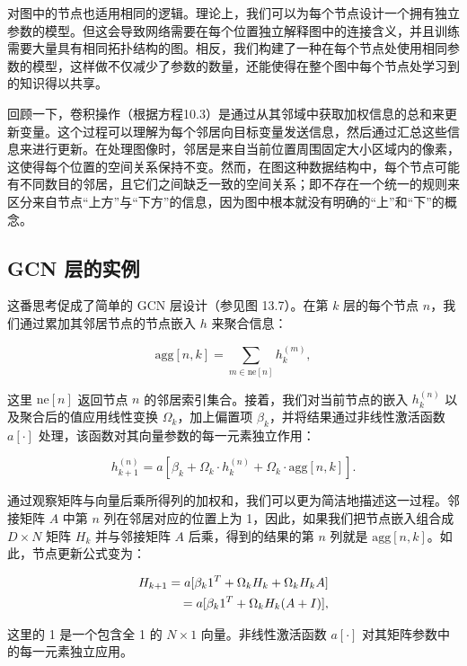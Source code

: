 \documentclass[lang=cn,newtx,10pt,scheme=chinese]{elegantbook}
\begin{document}
对图中的节点也适用相同的逻辑。理论上，我们可以为每个节点设计一个拥有独立参数的模型。但这会导致网络需要在每个位置独立解释图中的连接含义，并且训练需要大量具有相同拓扑结构的图。相反，我们构建了一种在每个节点处使用相同参数的模型，这样做不仅减少了参数的数量，还能使得在整个图中每个节点处学习到的知识得以共享。

回顾一下，卷积操作（根据方程10.3）是通过从其邻域中获取加权信息的总和来更新变量。这个过程可以理解为每个邻居向目标变量发送信息，然后通过汇总这些信息来进行更新。在处理图像时，邻居是来自当前位置周围固定大小区域内的像素，这使得每个位置的空间关系保持不变。然而，在图这种数据结构中，每个节点可能有不同数目的邻居，且它们之间缺乏一致的空间关系；即不存在一个统一的规则来区分来自节点“上方”与“下方”的信息，因为图中根本就没有明确的“上”和“下”的概念。

\subsection{GCN 层的实例}
这番思考促成了简单的 GCN 层设计（参见图 13.7）。在第 \(k\) 层的每个节点 \(n\)，我们通过累加其邻居节点的节点嵌入 \(h\) 来聚合信息：

\begin{equation}
\text{agg}[n, k] = \sum_{m \in \text{ne}[n]} h_k^{(m)}, 
\end{equation}

这里 \(\text{ne}[n]\) 返回节点 \(n\) 的邻居索引集合。接着，我们对当前节点的嵌入 \(h_k^{(n)}\) 以及聚合后的值应用线性变换 \(\Omega_k\)，加上偏置项 \(\beta_k\)，并将结果通过非线性激活函数 \(a[\cdot]\) 处理，该函数对其向量参数的每一元素独立作用：

\begin{equation}
h_{k+1}^{(n)} = a \left[ \beta_k + \Omega_k \cdot h_k^{(n)} + \Omega_k \cdot \text{agg}[n, k] \right]. 
\end{equation}

通过观察矩阵与向量后乘所得列的加权和，我们可以更为简洁地描述这一过程。邻接矩阵 \(A\) 中第 \(n\) 列在邻居对应的位置上为 1，因此，如果我们把节点嵌入组合成 \(D \times N\) 矩阵 \(H_k\) 并与邻接矩阵 \(A\) 后乘，得到的结果的第 \(n\) 列就是 \(\text{agg}[n, k]\)。如此，节点更新公式变为：


\begin{align}
H_{k+1} = a [\beta_{k} 1^T + \Omega_k H_k + \Omega_k H_k A] \notag \\
= a [\beta_{k} 1^T + \Omega_k H_k (A + I)], 
\end{align} 


这里的 1 是一个包含全 1 的 \(N \times 1\) 向量。非线性激活函数 \(a[\cdot]\) 对其矩阵参数中的每一元素独立应用。
\end{document}
